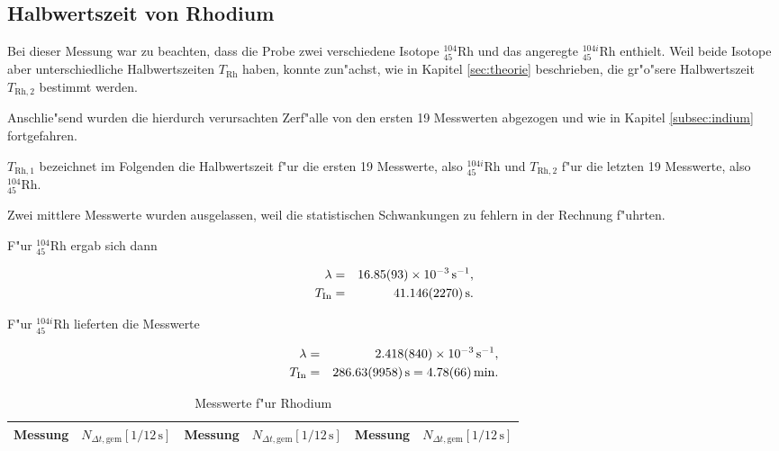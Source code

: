 	\clearpage

	\subsection{Halbwertszeit von Rhodium}
		\label{subsec:rhodium}
		Bei dieser Messung war zu beachten, dass die Probe zwei verschiedene Isotope ${}_{45}^{104}\mathrm{Rh}$ und das angeregte ${}_{45}^{104i}\mathrm{Rh}$ enthielt.
		Weil beide Isotope aber unterschiedliche Halbwertszeiten $T_\mathrm{Rh}$ haben,
		konnte zun"achst, wie in Kapitel \ref{sec:theorie} beschrieben, die gr"o"sere Halbwertszeit $T_{\mathrm{Rh}, 2}$ bestimmt werden.

		Anschlie"send wurden die hierdurch verursachten Zerf"alle von den ersten 19 Messwerten abgezogen und wie in Kapitel \ref{subsec:indium} fortgefahren.

		$T_{\mathrm{Rh}, 1}$ bezeichnet im Folgenden die Halbwertszeit f"ur die ersten 19 Messwerte, also ${}_{45}^{104i}\mathrm{Rh}$ und $T_{\mathrm{Rh}, 2}$ f"ur die letzten 19 Messwerte, also ${}_{45}^{104}\mathrm{Rh}$.

		Zwei mittlere Messwerte wurden ausgelassen, weil die statistischen Schwankungen zu fehlern in der Rechnung f"uhrten.
		\newline


		F"ur ${}_{45}^{104}\mathrm{Rh}$ ergab sich dann

		\begin{eqnarray*}
			\lambda & = & \SI{16.85 (93)e-3}{\per \second} , \\
			T_\mathrm{In} & = & \SI{41.146 (2270)}{\second} .
		\end{eqnarray*}

		F"ur ${}_{45}^{104i}\mathrm{Rh}$ lieferten die Messwerte

		\begin{eqnarray*}
			\lambda & = & \SI{2.418 (840)e-3}{\per \second} , \\
			T_\mathrm{In} & = & \SI{286.63 (9958)}{\second} = \SI{4.78 (66)}{\minute} .
		\end{eqnarray*}

		\clearpage

		\begin{table}[!h]
			\begin{center}
				\caption{Messwerte f"ur Rhodium}
				\label{tabelle:rhodium}
				\begin{tabular}{|c|c||c|c||c|c|}
					\hline 
					Messung & $N_{\Delta t, \mathrm{gem}}[1 / 12\,\mathrm{s}]$ & Messung & $N_{\Delta t, \mathrm{gem}}[1 / 12\,\mathrm{s}]$ & Messung & $N_{\Delta t, \mathrm{gem}}[1 / 12\,\mathrm{s}]$\\
					\hline 
					
					\hline 
				\end{tabular}
			\end{center}
		\end{table}

